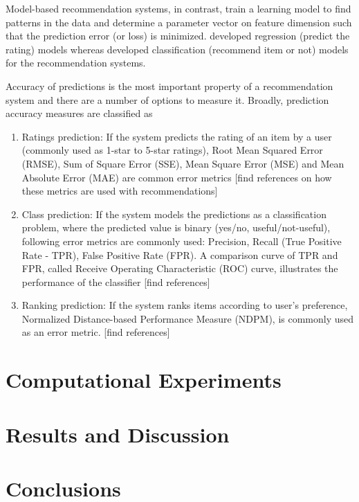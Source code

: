\documentclass[12pt]{article}
\begin{document}
Model-based recommendation systems, in contrast, train a learning model to find patterns in the data and determine a parameter vector on feature dimension such that the prediction error (or loss) is minimized. \cite{ge, wu, amini} developed regression (predict the rating) models whereas \cite{zhang-iyengar, resnick} developed classification (recommend item or not) models for the recommendation systems.

Accuracy of predictions is the most important property of a recommendation system and there are a number of options to measure it. Broadly, prediction accuracy measures are classified as \cite{ricci}

\begin{enumerate}
	\item Ratings prediction: If the system predicts the rating of an item by a user (commonly used as 1-star to 5-star ratings), Root Mean Squared Error (RMSE), Sum of Square Error (SSE), Mean Square Error (MSE) and Mean Absolute Error (MAE) are common error metrics [find references on how these metrics are used with recommendations]
	\item Class prediction: If the system models the predictions as a classification problem, where the predicted value is binary (yes/no, useful/not-useful), following error metrics are commonly used: Precision, Recall (True Positive Rate - TPR), False Positive Rate (FPR). A comparison curve of TPR and FPR, called Receive Operating Characteristic (ROC) curve, illustrates the performance of the classifier [find references]
	\item Ranking prediction: If the system ranks items according to user's preference, Normalized Distance-based Performance Measure (NDPM), is commonly used as an error metric. [find references]
\end{enumerate}

\section{Computational Experiments}

\section{Results and Discussion}

\section{Conclusions}
\end{document}
